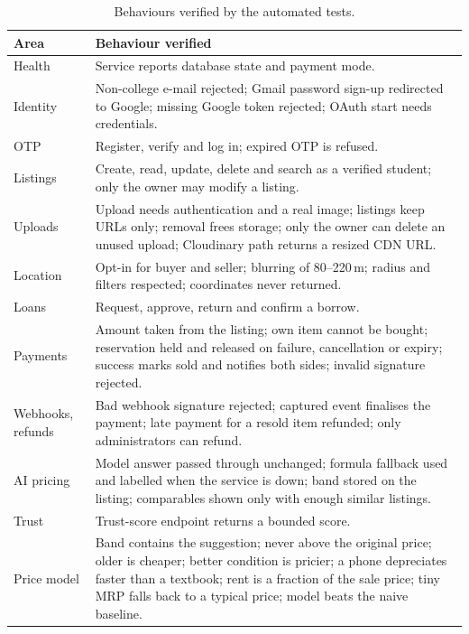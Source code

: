 \documentclass[12pt,letterpaper,twoside,openany]{report}
\begin{document}
\begin{table}[htbp]
\centering
\caption{Behaviours verified by the automated tests.}\label{tab:tests}
\small
\begin{tabularx}{\textwidth}{@{}L{2.0cm}X@{}}
\toprule
\textbf{Area} & \textbf{Behaviour verified}\\
\midrule
Health & Service reports database state and payment mode.\\
Identity & Non-college e-mail rejected; Gmail password sign-up redirected to Google; missing Google token
rejected; OAuth start needs credentials.\\
OTP & Register, verify and log in; expired OTP is refused.\\
Listings & Create, read, update, delete and search as a verified student; only the owner may modify a listing.\\
Uploads & Upload needs authentication and a real image; listings keep URLs only; removal frees storage;
only the owner can delete an unused upload; Cloudinary path returns a resized CDN URL.\\
Location & Opt-in for buyer and seller; blurring of 80--220\,m; radius and filters respected; coordinates
never returned.\\
Loans & Request, approve, return and confirm a borrow.\\
Payments & Amount taken from the listing; own item cannot be bought; reservation held and released on
failure, cancellation or expiry; success marks sold and notifies both sides; invalid signature rejected.\\
Webhooks, refunds & Bad webhook signature rejected; captured event finalises the payment; late payment for
a resold item refunded; only administrators can refund.\\
AI pricing & Model answer passed through unchanged; formula fallback used and labelled when the service is
down; band stored on the listing; comparables shown only with enough similar listings.\\
Trust & Trust-score endpoint returns a bounded score.\\
Price model & Band contains the suggestion; never above the original price; older is cheaper; better condition
is pricier; a phone depreciates faster than a textbook; rent is a fraction of the sale price; tiny MRP falls
back to a typical price; model beats the naive baseline.\\
\bottomrule
\end{tabularx}
\end{table}
\end{document}
